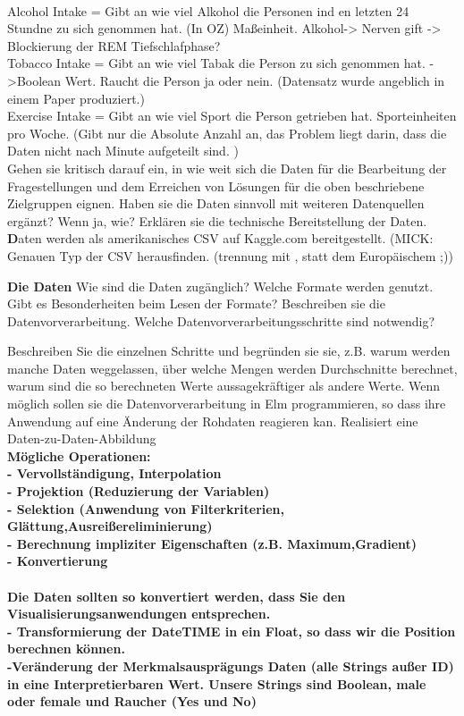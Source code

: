 \documentclass[usegeometry=true]{scrartcl}
\begin{document}
{\\ Alcohol Intake = Gibt an wie viel Alkohol die Personen ind en letzten 24 Stundne zu sich genommen hat. (In OZ)  Maßeinheit. Alkohol-> Nerven gift -> Blockierung der REM Tiefschlafphase? 
\\ Tobacco Intake = Gibt an wie viel Tabak die Person zu sich genommen hat. ->Boolean Wert. Raucht die Person ja oder nein. (Datensatz wurde angeblich in einem Paper produziert.)
\\ Exercise Intake = Gibt an wie viel Sport die Person getrieben hat. Sporteinheiten pro Woche. (Gibt nur die Absolute Anzahl an, das Problem liegt darin, dass die Daten nicht nach Minute aufgeteilt sind. ) \\ }
Gehen sie kritisch darauf ein, in wie weit sich die Daten für die Bearbeitung der Fragestellungen und dem Erreichen von Lösungen für die oben beschriebene Zielgruppen eignen. Haben sie die Daten sinnvoll mit weiteren Datenquellen ergänzt? Wenn ja, wie?
Erklären sie die technische Bereitstellung der Daten.
\textbf Daten werden als amerikanisches CSV auf Kaggle.com bereitgestellt. (MICK: Genauen Typ der CSV herausfinden. (trennung mit , statt dem Europäischem ;))

\textbf { Die Daten }
Wie sind die Daten zugänglich? Welche Formate werden genutzt. Gibt es Besonderheiten beim Lesen der Formate?
Beschreiben sie die Datenvorverarbeitung.
 Welche Datenvorverarbeitungsschritte sind notwendig?

  Beschreiben Sie die einzelnen Schritte und begründen sie sie, z.B. warum werden manche Daten weggelassen, über welche Mengen werden Durchschnitte berechnet, warum sind die so berechneten Werte aussagekräftiger als andere Werte. Wenn möglich sollen sie die Datenvorverarbeitung in Elm programmieren, so dass ihre Anwendung auf eine Änderung der Rohdaten reagieren kan.
 Realisiert eine Daten-zu-Daten-Abbildung\\
 \textbf { Mögliche Operationen:\\
    - Vervollständigung, Interpolation\\
    - Projektion (Reduzierung der Variablen)\\
    - Selektion (Anwendung von Filterkriterien, Glättung,Ausreißereliminierung)\\
    - Berechnung impliziter Eigenschaften (z.B. Maximum,Gradient)\\
    - Konvertierung\\
    \\

    Die Daten sollten so konvertiert werden, dass Sie den Visualisierungsanwendungen entsprechen. \\

    - Transformierung der DateTIME in ein Float, so dass wir die Position berechnen können.\\
    -Veränderung der Merkmalsausprägungs Daten (alle Strings außer ID) in eine Interpretierbaren Wert. Unsere Strings sind Boolean, male oder female und Raucher (Yes und No)
 }
\end{document}
